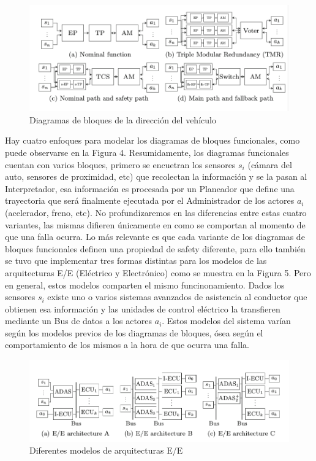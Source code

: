 \documentclass[11pt]{article}
\begin{document}
\begin{figure}[h]
	\includegraphics[scale=0.43]{blockdiagram.png} 
	\centering
	\caption{Diagramas de bloques de la direcci\'on del veh\'iculo}
\end{figure}

Hay cuatro enfoques para modelar los diagramas de bloques funcionales, como puede observarse en la Figura 4. Resumidamente, los diagramas funcionales cuentan con varios bloques, primero se encuetran los sensores $s_i$ (c\'amara del auto, sensores de proximidad, etc) que recolectan la informaci\'on y se la pasan al Interpretador, esa informaci\'on es procesada por un Planeador que define una trayectoria que ser\'a finalmente ejecutada por el Administrador de los actores $a_i$ (acelerador, freno, etc). No profundizaremos en las diferencias entre estas cuatro variantes, las mismas difieren \'unicamente en como se comportan al momento de que una falla ocurra. Lo m\'as relevante es que cada variante de los diagramas de bloques funcionales definen una propiedad de safety diferente, para ello tambi\'en se tuvo que implementar tres formas distintas para los modelos de las arquitecturas E/E (El\'ectrico y Electr\'onico) como se muestra en la Figura 5. Pero en general, estos modelos comparten el mismo funcinonamiento. Dados los sensores $s_i$ existe uno o varios sistemas avanzados de asistencia al conductor que obtienen esa informaci\'on y las unidades de control el\'ectrico la transfieren mediante un Bus de datos a los actores $a_i$. Estos modelos del sistema var\'ian seg\'un los modelos previos de los diagramas de bloques, \'osea seg\'un el comportamiento de los mismos a la hora de que ocurra una falla.

\begin{figure}[h]
	\includegraphics[scale=0.4]{EE.png}
	\centering
	\caption{Diferentes modelos de arquitecturas E/E}
\end{figure}
\end{document}
